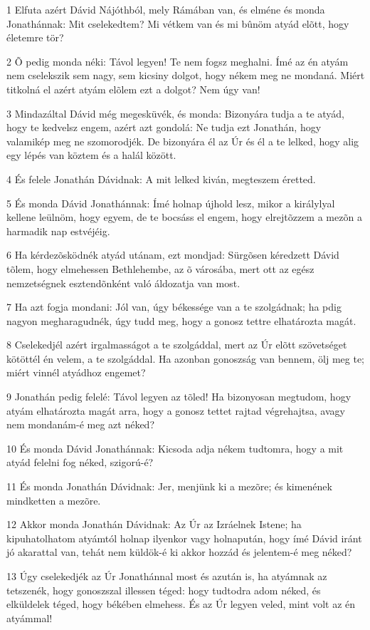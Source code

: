 \par 1 Elfuta azért Dávid Nájóthból, mely Rámában van, és elméne és monda Jonathánnak: Mit cselekedtem? Mi vétkem van és mi bûnöm atyád elõtt, hogy életemre tör?
\par 2 Õ pedig monda néki: Távol legyen! Te nem fogsz meghalni. Ímé az én atyám nem cselekszik sem nagy, sem kicsiny dolgot, hogy nékem meg ne mondaná. Miért titkolná el azért atyám elõlem ezt a dolgot? Nem úgy van!
\par 3 Mindazáltal Dávid még megesküvék, és monda: Bizonyára tudja a te atyád, hogy te kedvelsz engem, azért azt gondolá: Ne tudja ezt Jonathán, hogy valamikép meg ne szomorodjék. De bizonyára él az Úr és él a te lelked, hogy alig egy lépés van köztem és a halál között.
\par 4 És felele Jonathán Dávidnak: A mit lelked kiván, megteszem éretted.
\par 5 És monda Dávid Jonathánnak: Ímé holnap újhold lesz, mikor a királylyal kellene leülnöm, hogy egyem, de te bocsáss el engem, hogy elrejtõzzem a mezõn a harmadik nap estvéjéig.
\par 6 Ha kérdezõsködnék atyád utánam, ezt mondjad: Sürgõsen kéredzett Dávid tõlem, hogy elmehessen Bethlehembe, az õ városába, mert ott az egész nemzetségnek esztendõnként való áldozatja van most.
\par 7 Ha azt fogja mondani: Jól van, úgy békessége van a te szolgádnak; ha pdig nagyon megharagudnék, úgy tudd meg, hogy a gonosz tettre elhatározta magát.
\par 8 Cselekedjél azért irgalmasságot a te szolgáddal, mert az Úr elõtt szövetséget kötöttél én velem, a te szolgáddal. Ha azonban gonoszság van bennem, ölj meg te; miért vinnél atyádhoz engemet?
\par 9 Jonathán pedig felelé: Távol legyen az tõled! Ha bizonyosan megtudom, hogy atyám elhatározta magát arra, hogy a gonosz tettet rajtad végrehajtsa, avagy nem mondanám-é meg azt néked?
\par 10 És monda Dávid Jonathánnak: Kicsoda adja nékem tudtomra, hogy a mit atyád felelni fog néked, szigorú-é?
\par 11 És monda Jonathán Dávidnak: Jer, menjünk ki a mezõre; és kimenének mindketten a mezõre.
\par 12 Akkor monda Jonathán Dávidnak: Az Úr az Izráelnek Istene; ha kipuhatolhatom atyámtól holnap ilyenkor vagy holnapután, hogy ímé Dávid iránt jó akarattal van, tehát nem küldök-é ki akkor hozzád és jelentem-é meg néked?
\par 13 Úgy cselekedjék az Úr Jonathánnal most és azután is, ha atyámnak az tetszenék, hogy gonoszszal illessen téged: hogy tudtodra adom néked, és elküldelek téged, hogy békében elmehess. És az Úr legyen veled, mint volt az én atyámmal!
